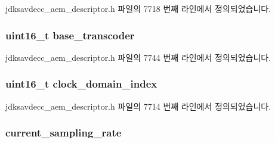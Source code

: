 jdksavdecc\+\_\+aem\+\_\+descriptor.\+h 파일의 7718 번째 라인에서 정의되었습니다.

\subsubsection[{\texorpdfstring{base\+\_\+transcoder}{base_transcoder}}]{\setlength{\rightskip}{0pt plus 5cm}uint16\+\_\+t base\+\_\+transcoder}\hypertarget{structjdksavdecc__descriptor__audio__unit_ac7e02a98f43dc72d6384a6635fbaf944}{}\label{structjdksavdecc__descriptor__audio__unit_ac7e02a98f43dc72d6384a6635fbaf944}


jdksavdecc\+\_\+aem\+\_\+descriptor.\+h 파일의 7744 번째 라인에서 정의되었습니다.

\subsubsection[{\texorpdfstring{clock\+\_\+domain\+\_\+index}{clock_domain_index}}]{\setlength{\rightskip}{0pt plus 5cm}uint16\+\_\+t clock\+\_\+domain\+\_\+index}\hypertarget{structjdksavdecc__descriptor__audio__unit_a6608f023d147b556a49527d568abed8e}{}\label{structjdksavdecc__descriptor__audio__unit_a6608f023d147b556a49527d568abed8e}


jdksavdecc\+\_\+aem\+\_\+descriptor.\+h 파일의 7714 번째 라인에서 정의되었습니다.

\subsubsection[{\texorpdfstring{current\+\_\+sampling\+\_\+rate}{current_sampling_rate}}]{ current\+\_\+sampling\+\_\+rate}\hypertarget{structjdksavdecc__descriptor__audio__unit_a081e14c5c832a659daf22003ed8e918d}{}\label{structjdksavdecc__descriptor__audio__unit_a081e14c5c832a659daf22003ed8e918d}


